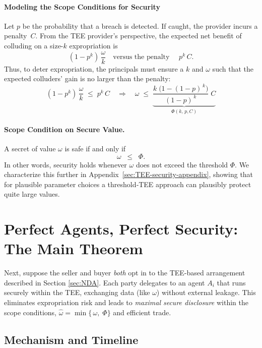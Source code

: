 \documentclass{article}
\begin{document}
\paragraph{Modeling the Scope Conditions for Security}
Let \(p\) be the probability that a breach is detected. If caught, the provider incurs a penalty~\(C\). From the TEE provider's perspective, the expected net benefit of colluding on a size-\(k\) expropriation is
\[
  (1 - p^k)\,\frac{\omega}{k}
  \quad\text{versus the penalty } \quad
  p^k\,C.
\]
Thus, to deter expropriation, the principals must ensure a \(k\) and \(\omega\) such that
the expected colluders' gain is no larger than the penalty:
\begin{equation}\label{eq:TEE_scope}
  (1 - p^k)\,\frac{\omega}{k} \;\le\; p^k\,C
  \quad\Longrightarrow\quad
  \omega \;\le\;   \underbrace{
    \frac{k\;\bigl(1 - (1-p)^{\,k}\bigr)}
         {(1-p)^{\,k}
  }
  \;C}_{\displaystyle\Phi(k,\,p, C)}
\end{equation}

\paragraph{Scope Condition on Secure Value.}
\label{cor:scope}
A secret of value $\omega$ is safe if and only if
\[
   \omega \;\;\le\;\; \Phi.
\]
In other words, security holds whenever $\omega$ does not exceed the threshold $\Phi$.
 We characterize this further in Appendix~\ref{sec:TEE-security-appendix}, showing that for plausible parameter choices a threshold‐TEE approach can plausibly protect quite large values. 

\section{Perfect Agents, Perfect Security: The Main Theorem}
\label{sec:TEE-agents-perfect}

Next, suppose the seller and buyer \emph{both} opt in to the TEE-based arrangement described in Section \ref{sec:NDA}. Each party delegates to an agent $A_i$ that runs securely within the TEE, exchanging data (like $\omega$) without external leakage. This eliminates expropriation risk and leads to \emph{maximal secure disclosure} within the scope conditions, $\hat{\omega} = \min \{\,\omega,\;\Phi\}$ and efficient trade.

\subsection{Mechanism and Timeline}
\end{document}
